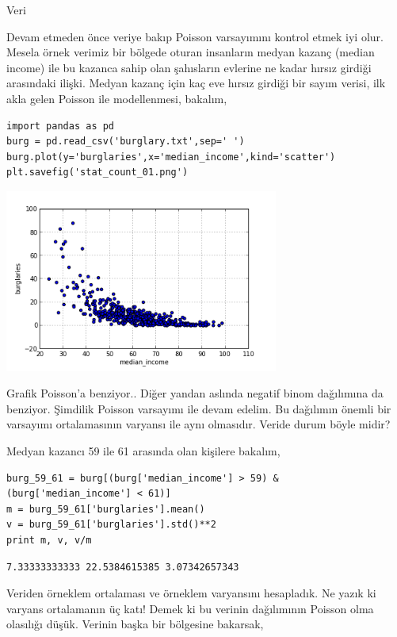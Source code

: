\documentclass[12pt,fleqn]{article}\usepackage{../../common}
\begin{document}
Veri

Devam etmeden önce veriye bakıp Poisson varsayımını kontrol etmek iyi
olur. Mesela örnek verimiz bir bölgede oturan insanların medyan kazanç
(median income) ile bu kazanca sahip olan şahısların evlerine ne kadar
hırsız girdiği arasındaki ilişki. Medyan kazanç için kaç eve hırsız girdiği
bir sayım verisi, ilk akla gelen Poisson ile modellenmesi, bakalım,

\begin{verbatim}
import pandas as pd
burg = pd.read_csv('burglary.txt',sep=' ')
burg.plot(y='burglaries',x='median_income',kind='scatter')
plt.savefig('stat_count_01.png')
\end{verbatim}

\includegraphics[height=6cm]{stat_count_01.png}

Grafik Poisson'a benziyor.. Diğer yandan aslında negatif binom dağılımına
da benziyor. Şimdilik Poisson varsayımı ile devam edelim. Bu dağılımın
önemli bir varsayımı ortalamasının varyansı ile aynı olmasıdır. Veride
durum böyle midir?

Medyan kazancı 59 ile 61 arasında olan kişilere bakalım,

\begin{verbatim}
burg_59_61 = burg[(burg['median_income'] > 59) & (burg['median_income'] < 61)]
m = burg_59_61['burglaries'].mean()
v = burg_59_61['burglaries'].std()**2
print m, v, v/m
\end{verbatim}

\begin{verbatim}
7.33333333333 22.5384615385 3.07342657343
\end{verbatim}

Veriden örneklem ortalaması ve örneklem varyansını hesapladık. Ne yazık ki
varyans ortalamanın üç katı! Demek ki bu verinin dağılımının Poisson olma
olasılığı düşük. Verinin başka bir bölgesine bakarsak,
\end{document}
